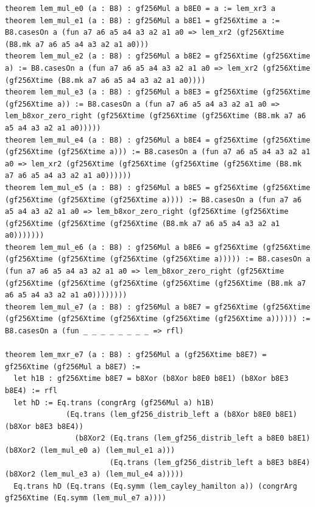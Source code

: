 \documentclass[11pt,letterpaper]{article}
\theoremstyle{spectralthm}
\begin{document}
\begin{lstlisting}[language=Lean4,caption={Standalone Pure Init.Prelude Term-Mode Lean 4 Kernel Suite (thm30--thm61, v0.0.0, 0 sorry, 0 axioms).},label={lst:lean_unified}]
theorem lem_mul_e0 (a : B8) : gf256Mul a b8E0 = a := lem_xr3 a
theorem lem_mul_e1 (a : B8) : gf256Mul a b8E1 = gf256Xtime a := B8.casesOn a (fun a7 a6 a5 a4 a3 a2 a1 a0 => lem_xr2 (gf256Xtime (B8.mk a7 a6 a5 a4 a3 a2 a1 a0)))
theorem lem_mul_e2 (a : B8) : gf256Mul a b8E2 = gf256Xtime (gf256Xtime a) := B8.casesOn a (fun a7 a6 a5 a4 a3 a2 a1 a0 => lem_xr2 (gf256Xtime (gf256Xtime (B8.mk a7 a6 a5 a4 a3 a2 a1 a0))))
theorem lem_mul_e3 (a : B8) : gf256Mul a b8E3 = gf256Xtime (gf256Xtime (gf256Xtime a)) := B8.casesOn a (fun a7 a6 a5 a4 a3 a2 a1 a0 => lem_b8xor_zero_right (gf256Xtime (gf256Xtime (gf256Xtime (B8.mk a7 a6 a5 a4 a3 a2 a1 a0)))))
theorem lem_mul_e4 (a : B8) : gf256Mul a b8E4 = gf256Xtime (gf256Xtime (gf256Xtime (gf256Xtime a))) := B8.casesOn a (fun a7 a6 a5 a4 a3 a2 a1 a0 => lem_xr2 (gf256Xtime (gf256Xtime (gf256Xtime (gf256Xtime (B8.mk a7 a6 a5 a4 a3 a2 a1 a0))))))
theorem lem_mul_e5 (a : B8) : gf256Mul a b8E5 = gf256Xtime (gf256Xtime (gf256Xtime (gf256Xtime (gf256Xtime a)))) := B8.casesOn a (fun a7 a6 a5 a4 a3 a2 a1 a0 => lem_b8xor_zero_right (gf256Xtime (gf256Xtime (gf256Xtime (gf256Xtime (gf256Xtime (B8.mk a7 a6 a5 a4 a3 a2 a1 a0)))))))
theorem lem_mul_e6 (a : B8) : gf256Mul a b8E6 = gf256Xtime (gf256Xtime (gf256Xtime (gf256Xtime (gf256Xtime (gf256Xtime a))))) := B8.casesOn a (fun a7 a6 a5 a4 a3 a2 a1 a0 => lem_b8xor_zero_right (gf256Xtime (gf256Xtime (gf256Xtime (gf256Xtime (gf256Xtime (gf256Xtime (B8.mk a7 a6 a5 a4 a3 a2 a1 a0))))))))
theorem lem_mul_e7 (a : B8) : gf256Mul a b8E7 = gf256Xtime (gf256Xtime (gf256Xtime (gf256Xtime (gf256Xtime (gf256Xtime (gf256Xtime a)))))) := B8.casesOn a (fun _ _ _ _ _ _ _ _ => rfl)

theorem lem_mxr_e7 (a : B8) : gf256Mul a (gf256Xtime b8E7) = gf256Xtime (gf256Mul a b8E7) :=
  let h1B : gf256Xtime b8E7 = b8Xor (b8Xor b8E0 b8E1) (b8Xor b8E3 b8E4) := rfl
  let hD := Eq.trans (congrArg (gf256Mul a) h1B)
              (Eq.trans (lem_gf256_distrib_left a (b8Xor b8E0 b8E1) (b8Xor b8E3 b8E4))
                (b8Xor2 (Eq.trans (lem_gf256_distrib_left a b8E0 b8E1) (b8Xor2 (lem_mul_e0 a) (lem_mul_e1 a)))
                        (Eq.trans (lem_gf256_distrib_left a b8E3 b8E4) (b8Xor2 (lem_mul_e3 a) (lem_mul_e4 a)))))
  Eq.trans hD (Eq.trans (Eq.symm (lem_cayley_hamilton a)) (congrArg gf256Xtime (Eq.symm (lem_mul_e7 a))))


\end{lstlisting}
\end{document}
